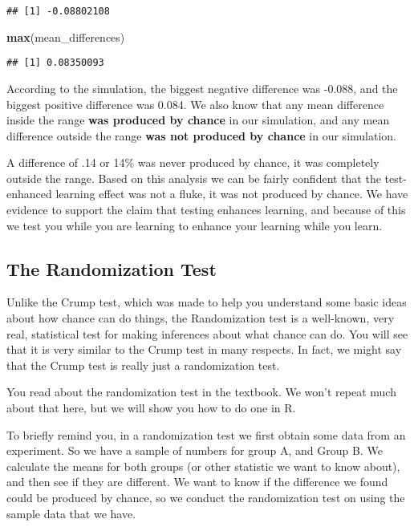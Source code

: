 \documentclass[
]{book}
\newenvironment{Shaded}{\begin{snugshade}}{\end{snugshade}}
\newcommand{\FunctionTok}[1]{\textcolor[rgb]{0.13,0.29,0.53}{\textbf{#1}}}
\newcommand{\NormalTok}[1]{#1}
\begin{document}
\begin{verbatim}
## [1] -0.08802108
\end{verbatim}

\begin{Shaded}
\begin{Highlighting}[]
\FunctionTok{max}\NormalTok{(mean\_differences)}
\end{Highlighting}
\end{Shaded}

\begin{verbatim}
## [1] 0.08350093
\end{verbatim}

According to the simulation, the biggest negative difference was -0.088, and the biggest positive difference was 0.084. We also know that any mean difference inside the range \textbf{was produced by chance} in our simulation, and any mean difference outside the range \textbf{was not produced by chance} in our simulation.

A difference of .14 or 14\% was never produced by chance, it was completely outside the range. Based on this analysis we can be fairly confident that the test-enhanced learning effect was not a fluke, it was not produced by chance. We have evidence to support the claim that testing enhances learning, and because of this we test you while you are learning to enhance your learning while you learn.

\hypertarget{the-randomization-test}{%
\subsection{The Randomization Test}\label{the-randomization-test}}

Unlike the Crump test, which was made to help you understand some basic ideas about how chance can do things, the Randomization test is a well-known, very real, statistical test for making inferences about what chance can do. You will see that it is very similar to the Crump test in many respects. In fact, we might say that the Crump test is really just a randomization test.

You read about the randomization test in the textbook. We won't repeat much about that here, but we will show you how to do one in R.

To briefly remind you, in a randomization test we first obtain some data from an experiment. So we have a sample of numbers for group A, and Group B. We calculate the means for both groups (or other statistic we want to know about), and then see if they are different. We want to know if the difference we found could be produced by chance, so we conduct the randomization test on using the sample data that we have.
\end{document}
